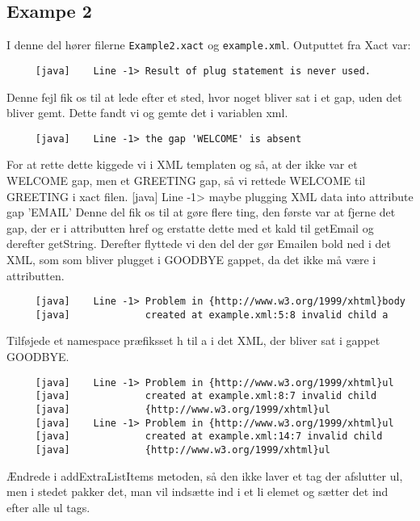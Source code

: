 \documentclass[a4paper,10pt]{article}
\begin{document}
\subsection*{Exampe 2}
I denne del hører filerne \texttt{Example2.xact} og \texttt{example.xml}. Outputtet fra Xact var:
\begin{lstlisting}
     [java]    Line -1> Result of plug statement is never used.
\end{lstlisting}
Denne fejl fik os til at lede efter et sted, hvor noget bliver sat i et gap, uden det bliver gemt. Dette fandt vi og gemte det i variablen xml.
\begin{lstlisting}
     [java]    Line -1> the gap 'WELCOME' is absent
\end{lstlisting}
For at rette dette kiggede vi i XML templaten og så, at der ikke var et WELCOME gap, men et GREETING gap, så vi rettede WELCOME til GREETING i xact filen.
     [java]    Line -1> maybe plugging XML data into attribute gap 'EMAIL'
Denne del fik os til at gøre flere ting, den første var at fjerne det gap, der er i attributten href og erstatte dette med et kald til getEmail og derefter getString. Derefter flyttede vi den del der gør Emailen bold ned i det XML, som som bliver plugget i GOODBYE gappet, da det ikke må være i attributten.
\begin{lstlisting}
     [java]    Line -1> Problem in {http://www.w3.org/1999/xhtml}body 
     [java]             created at example.xml:5:8 invalid child a
\end{lstlisting}
Tilføjede et namespace præfiksset h til a i det XML, der bliver sat i gappet GOODBYE.
\begin{lstlisting}
     [java]    Line -1> Problem in {http://www.w3.org/1999/xhtml}ul 
     [java]             created at example.xml:8:7 invalid child
     [java]             {http://www.w3.org/1999/xhtml}ul
     [java]    Line -1> Problem in {http://www.w3.org/1999/xhtml}ul 
     [java]             created at example.xml:14:7 invalid child 
     [java]             {http://www.w3.org/1999/xhtml}ul
\end{lstlisting}
Ændrede i addExtraListItems metoden, så den ikke laver et tag der afslutter ul, men i stedet pakker det, man vil indsætte ind i et li elemet og sætter det ind efter alle ul tags.
\end{document}
